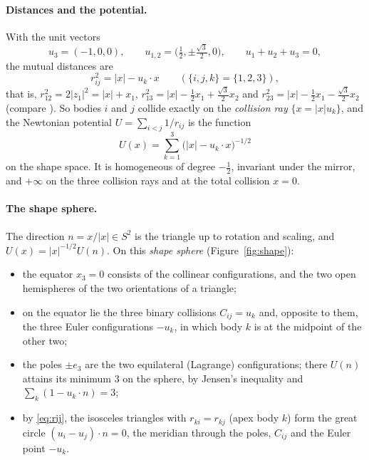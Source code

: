 \documentclass[11pt]{article}
\theoremstyle{definition}
\begin{document}
\paragraph{Distances and the potential.} With the unit vectors
\[
  u_3=(-1,0,0),\qquad u_{1,2}=\bigl(\tfrac12,\pm\tfrac{\sqrt3}2,0\bigr),\qquad u_1+u_2+u_3=0,
\]
the mutual distances are
\begin{equation}\label{eq:rij}
  r_{ij}^2=|x|-u_k\cdot x\qquad(\{i,j,k\}=\{1,2,3\}),
\end{equation}
that is, $r_{12}^2=2|z_1|^2=|x|+x_1$, $r_{13}^2=|x|-\tfrac12x_1+\tfrac{\sqrt3}2x_2$ and
$r_{23}^2=|x|-\tfrac12x_1-\tfrac{\sqrt3}2x_2$ (compare \cite[\S5.1]{Mpants}). So bodies $i$ and $j$ collide exactly on
the \emph{collision ray} $\{x=|x|u_k\}$, and the Newtonian potential $U=\sum_{i<j}1/r_{ij}$ is the function
\[
  U(x)=\sum_{k=1}^{3}\bigl(|x|-u_k\cdot x\bigr)^{-1/2}
\]
on the shape space. It is homogeneous of degree $-\tfrac12$, invariant under the mirror, and $+\infty$ on the three
collision rays and at the total collision $x=0$.

\paragraph{The shape sphere.} The direction $n=x/|x|\in S^2$ is the triangle up to rotation and scaling, and
$U(x)=|x|^{-1/2}U(n)$. On this \emph{shape sphere} (Figure~\ref{fig:shape}):
\begin{itemize}
\item the equator $x_3=0$ consists of the collinear configurations, and the two open hemispheres of the two
orientations of a triangle;
\item on the equator lie the three binary collisions $C_{ij}=u_k$ and, opposite to them, the three Euler
configurations $-u_k$, in which body $k$ is at the midpoint of the other two;
\item the poles $\pm e_3$ are the two equilateral (Lagrange) configurations; there $U(n)$ attains its minimum $3$ on
the sphere, by Jensen's inequality and $\sum_k(1-u_k\cdot n)=3$;
\item by \eqref{eq:rij}, the isosceles triangles with $r_{ki}=r_{kj}$ (apex body $k$) form the great circle
$(u_i-u_j)\cdot n=0$, the meridian through the poles, $C_{ij}$ and the Euler point $-u_k$.
\end{itemize}
\end{document}
